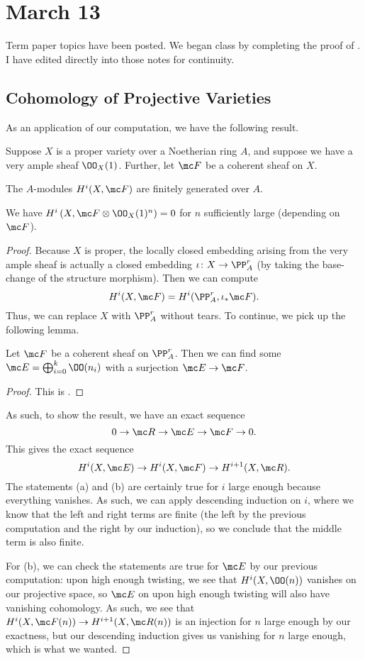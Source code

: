 \documentclass[../notes.tex]{subfiles}
\begin{document}
\section{March 13}

Term paper topics have been posted. We began class by completing the proof of . I have edited directly into those notes for continuity.

\subsection{Cohomology of Projective Varieties}
As an application of our computation, we have the following result.
\begin{theorem}[Serre]
	Suppose $X$ is a proper variety over a Noetherian ring $A$, and suppose we have a very ample sheaf $\OO_X(1)$. Further, let $\mc F$ be a coherent sheaf on $X$.
	\begin{listalph}
		\item The $A$-modules $H^i(X,\mc F)$ are finitely generated over $A$.
		\item We have $H^i\left(X,\mc F\otimes\OO_X(1)^n\right)=0$ for $n$ sufficiently large (depending on $\mc F$).
	\end{listalph}
\end{theorem}
\begin{proof}
	Because $X$ is proper, the locally closed embedding arising from the very ample sheaf is actually a closed embedding $\iota\colon X\to\PP^r_A$ (by taking the base-change of the structure morphism). Then we can compute
	\[H^i(X,\mc F)=H^i(\PP^r_A,\iota_*\mc F).\]
	Thus, we can replace $X$ with $\PP^r_A$ without tears. To continue, we pick up the following lemma.
	\begin{lemma}
		Let $\mc F$ be a coherent sheaf on $\PP^r_A$. Then we can find some $\mc E=\bigoplus_{i=0}^k\OO(n_i)$ with a surjection $\mc E\to\mc F$.
	\end{lemma}
	\begin{proof}
		This is \cite[Corollary~II.5.18]{hartshorne}.
	\end{proof}
	As such, to show the result, we have an exact sequence
	\[0\to\mc R\to\mc E\to\mc F\to0.\]
	This gives the exact sequence
	\[H^i(X,\mc E)\to H^i(X,\mc F)\to H^{i+1}(X,\mc R).\]
	The statements (a) and (b) are certainly true for $i$ large enough because everything vanishes. As such, we can apply descending induction on $i$, where we know that the left and right terms are finite (the left by the previous computation and the right by our induction), so we conclude that the middle term is also finite.

	For (b), we can check the statements are true for $\mc E$ by our previous computation: upon high enough twisting, we see that $H^i(X,\OO(n))$ vanishes on our projective space, so $\mc E$ on upon high enough twisting will also have vanishing cohomology. As such, we see that $H^i(X,\mc F(n))\to H^{i+1}(X,\mc R(n))$ is an injection for $n$ large enough by our exactness, but our descending induction gives us vanishing for $n$ large enough, which is what we wanted.
\end{proof}
\end{document}
